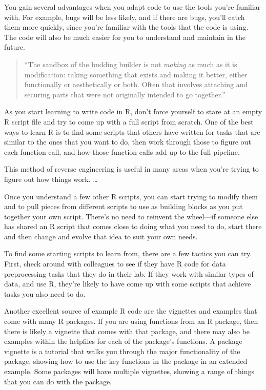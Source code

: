 \documentclass[]{tufte-book}
\begin{document}
You gain several advantages when you adapt code to use the tools you're familiar
with. For example, bugs will be less likely, and if there are bugs, you'll
catch them more quickly, since you're familiar with the tools that the code is
using. The code will also be much easier for you to understand and maintain in
the future.

\begin{quote}
``The sandbox of the budding builder is not \emph{making} as much as it is
modification: taking something that exists and making it better, either
functionally or aesthetically or both. Often that involves attaching and
securing parts that were not originally intended to go together.'' \citep{savage2020every}
\end{quote}

As you start learning to write code in R, don't force yourself to stare at an
empty R script file and try to come up with a full script from scratch. One of the
best ways to learn R is to find some scripts that others have written for tasks
that are similar to the ones that you want to do, then work through those to figure
out each function call, and how those function calls add up to the full pipeline.

This method of reverse engineering is useful in many areas when you're trying to
figure out how things work. \ldots{}

Once you understand a few other R scripts, you can start trying to modify them and
to pull pieces from different scripts to use as building blocks as you put together
your own script. There's no need to reinvent the wheel---if someone else has
shared an R script that comes close to doing what you need to do, start there and
then change and evolve that idea to suit your own needs.

To find some starting scripts to learn from, there are a few tactics you can try.
First, check around with colleagues to see if they have R code for data preprocessing
tasks that they do in their lab. If they work with similar types of data, and use R,
they're likely to have come up with some scripts that achieve tasks you also need to
do.

Another excellent source of example R code are the vignettes and examples that come
with many R packages. If you are using functions from an R package, then there is likely
a vignette that comes with that package, and there may also be examples within the
helpfiles for each of the package's functions. A package vignette is a tutorial that
walks you through the major functionality of the package, showing how to use the
key functions in the package in an extended example. Some packages will have multiple
vignettes, showing a range of things that you can do with the package.
\end{document}
